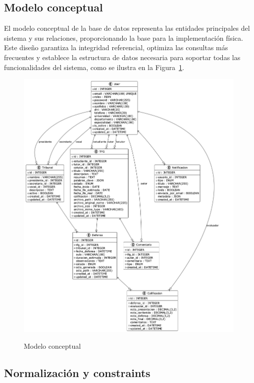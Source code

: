 \documentclass[12pt,a4paper,oneside]{report}
\providecommand{\pandocbounded}[1]{#1}
\begin{document}
\subsection{Modelo conceptual}\label{modelo-conceptual}

El modelo conceptual de la base de datos representa las entidades principales del sistema y sus relaciones, proporcionando la base para la implementación física. Este diseño garantiza la integridad referencial, optimiza las consultas más frecuentes y establece la estructura de datos necesaria para soportar todas las funcionalidades del sistema, como se ilustra en la Figura~\ref{fig:modelo-conceptual}.

\begin{figure}[H]
\centering
\pandocbounded{\includegraphics[keepaspectratio,alt={Modelo conceptual}]{processed/images/05_diseno_plantuml_3.png}}
\caption{Modelo conceptual}
\label{fig:modelo-conceptual}
\end{figure}

\subsection{Normalización y
constraints}\label{normalizaciuxf3n-y-constraints}
\end{document}

